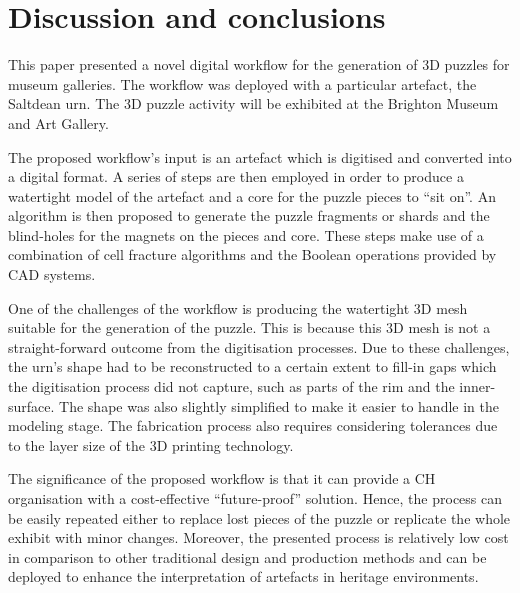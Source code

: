\documentclass[acmlarge,screen,dvipsnames]{acmart}
\begin{document}

\section{Discussion and conclusions}
\label{conclusions}

This paper presented a novel digital workflow for the generation of 3D
puzzles for museum galleries. The workflow was deployed with a
particular artefact, the Saltdean urn. The 3D puzzle activity will be
exhibited at the Brighton Museum and Art Gallery.

The proposed workflow's input is an artefact which is digitised and
converted into a digital format. A series of steps are then employed
in order to produce a watertight model of the artefact and a core for
the puzzle pieces to ``sit on''. An algorithm is then proposed to
generate the puzzle fragments or shards and the blind-holes for the
magnets on the pieces and core. These steps make use of a combination
of cell fracture algorithms and the Boolean operations provided by CAD
systems.

One of the challenges of the workflow is producing the watertight 3D
mesh suitable for the generation of the puzzle. This is because this
3D mesh is not a straight-forward outcome from the digitisation
processes. Due to these challenges, the urn's shape had to be
reconstructed to a certain extent to fill-in gaps which the
digitisation process did not capture, such as parts of the rim and the
inner-surface. The shape was also slightly simplified to make it
easier to handle in the modeling stage. The fabrication process also
requires considering tolerances due to the layer size of the 3D
printing technology.

The significance of the proposed workflow is that it can provide a CH
organisation with a cost-effective ``future-proof'' solution. Hence,
the process can be easily repeated either to replace lost pieces of
the puzzle or replicate the whole exhibit with minor
changes. Moreover, the presented process is relatively low cost in
comparison to other traditional design and production methods and can
be deployed to enhance the interpretation of artefacts in heritage
environments.
\end{document}

